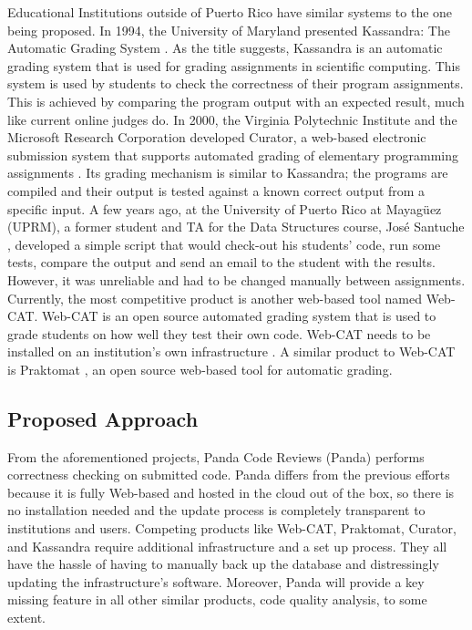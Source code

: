 Educational Institutions outside of Puerto Rico have similar systems to the one
being proposed. In 1994, the University of Maryland presented Kassandra: The
Automatic Grading System \cite{Matt1994}. As the title suggests, Kassandra is an
automatic grading system that is used for grading assignments in scientific
computing. This system is used by students to check the correctness of their
program assignments. This is achieved by comparing the program output with an
expected result, much like current online judges do. In 2000, the Virginia
Polytechnic Institute and the Microsoft Research Corporation developed Curator,
a web-based electronic submission system that supports automated grading of
elementary programming assignments \cite{Curator}. Its grading mechanism is
similar to Kassandra; the programs are compiled and their output is tested
against a known correct output from a specific input. A few years ago, at the
University of Puerto Rico at Mayagüez (UPRM), a former student and TA for the
Data  Structures course, José Santuche \cite{Santuche}, developed a simple
script that would check-out his students' code, run some tests, compare the
output and send an email to the student with the results. However, it was
unreliable and had to be changed manually between assignments. Currently, the
most competitive product is another web-based tool named Web-CAT. Web-CAT is an
open source automated grading system that is used to grade students on how well
they test their own code. Web-CAT needs to be installed on an institution's own
infrastructure \cite{WebCat}. A similar product to Web-CAT is Praktomat
\cite{Praktomat}, an open source web-based tool for automatic grading.

\subsection{Proposed Approach}

From the aforementioned projects, Panda Code Reviews (Panda) performs
correctness checking on submitted code. Panda differs from the previous efforts
because it is fully Web-based and hosted in the cloud out of the box, so there
is no installation needed and the update process is completely transparent to
institutions and users. Competing products like Web-CAT, Praktomat, Curator, and
Kassandra require additional infrastructure and a set up process. They all have
the hassle of having to manually back up the database and distressingly updating
the infrastructure's software. Moreover, Panda will provide a key missing
feature in all other similar products, code quality analysis, to some extent.

